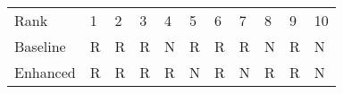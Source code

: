 \begin{tabular}{lllllllllll}
Rank & 1 & 2 & 3 & 4 & 5 & 6 & 7 & 8 & 9 & 10 \\
Baseline & R & R & R & N & R & R & R & N & R & N \\
Enhanced & R & R & R & R & N & R & N & R & R & N \\
\end{tabular}
